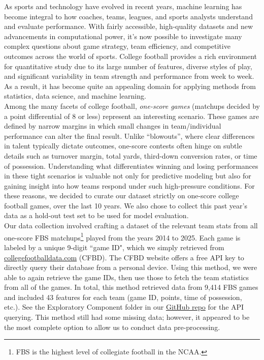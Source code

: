 \documentclass[10pt]{article}
\begin{document}
As sports and technology have evolved in recent years, machine learning has become integral to how coaches, teams, leagues, and sports analysts understand and evaluate performance. With fairly accessible, high-quality datasets and new advancements in computational power, it’s now possible to investigate many complex questions about game strategy, team efficiency, and competitive outcomes across the world of sports. College football provides a rich environment for quantitative study due to its large number of features, diverse styles of play, and significant variability in team strength and performance from week to week. As a result, it has become quite an appealing domain for applying methods from statistics, data science, and machine learning.\\

Among the many facets of college football, \textit{one-score games} (matchups decided by a point differential of 8 or less) represent an interesting scenario. These games are defined by narrow margins in which small changes in team/individual performance can alter the final result. Unlike “blowouts”, where clear differences in talent typically dictate outcomes, one-score contests often hinge on subtle details such as turnover margin, total yards, third-down conversion rates, or time of possession. Understanding what differentiates winning and losing performances in these tight scenarios is valuable not only for predictive modeling but also for gaining insight into how teams respond under such high-pressure conditions. For these reasons, we decided to curate our dataset strictly on one-score college football games, over the last 10 years. We also chose to collect this past year's data as a hold-out test set to be used for model evaluation.\\

Our data collection involved crafting a dataset of the relevant team stats from all one-score FBS matchups\footnote{FBS is the highest level of collegiate football in the NCAA.} played from the years 2014 to 2025. Each game is labeled by a unique 9-digit ``game ID", which we simply retrieved from \href{collegefootballdata.com}{collegefootballdata.com} (CFBD). The CFBD website offers a free API key to directly query their database from a personal device. Using this method, we were able to again retrieve the game IDs, then use those to fetch the team statistics from all of the games. In total, this method retrieved data from 9,414 FBS games and included 43 features for each team (game ID, points, time of possession, etc.). See the Exploratory Component folder in our \href{https://github.com/HarounShah/cis5190-final-project}{GitHub repo} for the API querying. This method still had some missing data; however, it appeared to be the most complete option to allow us to conduct data pre-processing.
\end{document}
